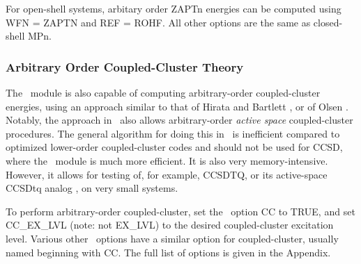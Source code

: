 For open-shell systems, arbitary order ZAPTn energies can be computed
using WFN = ZAPTN and REF = ROHF.  All other options are the same as
closed-shell MPn.

\subsubsection{Arbitrary Order Coupled-Cluster Theory} The
\PSIdetci\ module is also capable of computing arbitrary-order
coupled-cluster energies, using an approach similar to that of Hirata
and Bartlett \cite{Hirata:2000:216}, or of Olsen \cite{Olsen:2000:7140}.
Notably, the approach in \PSIdetci\ also allows arbitrary-order {\em
active space} coupled-cluster procedures.  The general algorithm
for doing this in \PSIdetci\ is inefficient compared to optimized
lower-order coupled-cluster codes and should not be used for CCSD,
where the \PSIccenergy\ module is much more efficient.  It is also very
memory-intensive.  However, it allows for testing of, for example,
CCSDTQ, or its active-space CCSDtq analog \cite{Piecuch:1999:6103},
on very small systems.

To perform arbitrary-order coupled-cluster, set the \PSIdetci\ option
CC to TRUE, and set CC\_EX\_LVL (note: not EX\_LVL) to the desired
coupled-cluster excitation level.  Various other \PSIdetci\ options have a
similar option for coupled-cluster, usually named beginning with CC.  The
full list of options is given in the Appendix.


